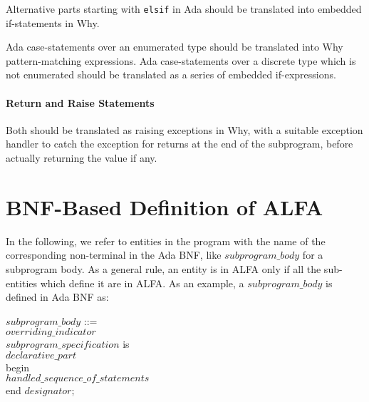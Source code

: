 \documentclass{article}
\newcounter{example}
\newcommand{\bnf}[1]{$\mathit{#1}$}
\begin{document}
Alternative parts starting with \verb|elsif| in Ada should be translated into
embedded if-statements in Why. 

Ada case-statements over an enumerated type should be translated into Why
pattern-matching expressions. Ada case-statements over a discrete type which is
not enumerated should be translated as a series of embedded if-expressions.

\paragraph{Return and Raise Statements} 

Both should be translated as raising exceptions in Why, with a suitable
exception handler to catch the exception for returns at the end of the
subprogram, before actually returning the value if any.




\appendix

\section{BNF-Based Definition of ALFA}
\label{sec:bnf-alfa}

In the following, we refer to entities in the program with the name of the
corresponding non-terminal in the Ada BNF, like \bnf{subprogram\_body} for a
subprogram body. As a general rule, an entity is in ALFA only if all the
sub-entities which define it are in ALFA. As an example, a
\bnf{subprogram\_body} is defined in Ada BNF as:

\hspace*{1cm}\bnf{subprogram\_body} ::=\\
\hspace*{2cm}\lbrack\bnf{overriding\_indicator}\rbrack\\
\hspace*{2cm}\bnf{subprogram\_specification} is\\
\hspace*{3cm}  \bnf{declarative\_part}\\
\hspace*{2cm}  begin\\
\hspace*{3cm}    \bnf{handled\_sequence\_of\_statements}\\
\hspace*{2cm}  end \lbrack\bnf{designator}\rbrack;\\
\end{document}
